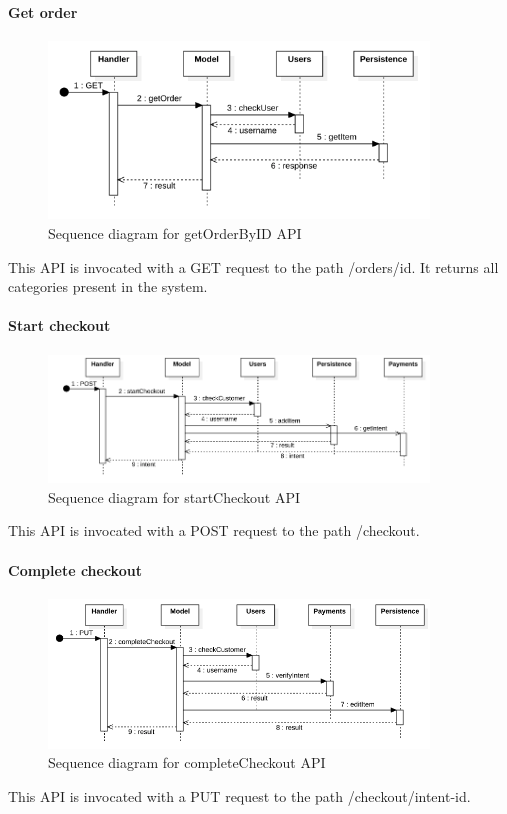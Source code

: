\paragraph*{Get order}
\begin{figure}[H]
    \includegraphics[width=0.9\textwidth]{res/images/sequence-diagrams/orders/getOrderByID.png}
    \caption{Sequence diagram for getOrderByID API}
\end{figure}
This API is invocated with a GET request to the path /orders/{id}. It returns all categories present in the system.

\paragraph*{Start checkout}
\begin{figure}[H]
    \includegraphics[width=0.9\textwidth]{res/images/sequence-diagrams/orders/startCheckout.png}
    \caption{Sequence diagram for startCheckout API}
\end{figure}
This API is invocated with a POST request to the path /checkout.

\paragraph*{Complete checkout}
\begin{figure}[H]
    \includegraphics[width=0.9\textwidth]{res/images/sequence-diagrams/orders/completeCheckout.png}
    \caption{Sequence diagram for completeCheckout API}
\end{figure}
This API is invocated with a PUT request to the path /checkout/{intent-id}.


